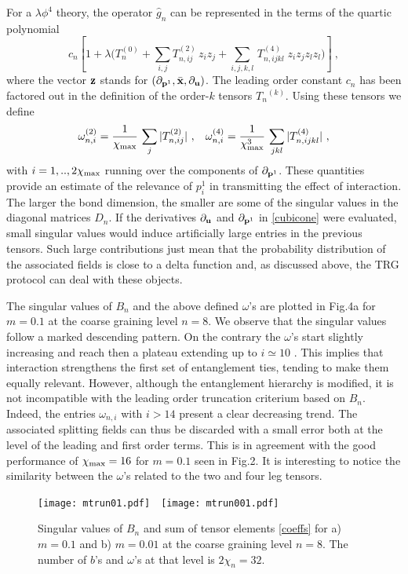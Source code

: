 \documentclass[a4paper,preprintnumbers,nofootinbib,twocolumn]{quantumarticle}
\newcommand{\be}{\begin{equation}} \newcommand{\ee}{\end{equation}}
\begin{document}
For a $\lambda \phi^4$ theory,  the operator ${\hat g}_n$ 
can be represented in the terms of the quartic polynomial
\be
c_n \left[ 1+\lambda \Big( T^{(0)}_n + \sum_{i,j} T^{(2)}_{n,ij}\,  z_i z_j +   \sum_{i,j,k,l} \, T^{(4)}_{n,ijkl} \; z_i z_j z_l z_l  \Big)  \right]\ ,
\label{poly}
\ee
where the vector ${\bf z}$  stands for  $( \partial_{{\bf p}^1},{\bar {\bf x}}, \partial_{{\bf u}})$. 
The leading order constant $c_n$ 
has been factored out in the definition of the order-$k$ tensors ${T_n}^{(k)}$. Using these tensors we define
\be
\omega_{n,i}^{(2)}={1 \over \chi_{\rm max}} \, \sum_j |T^{(2)}_{n,ij}| \ , \hspace{3mm} \omega_{n,i}^{(4)}= {1 \over \chi_{\rm max}^3}\, \sum_{jkl} |T^{(4)}_{n,ijkl} | \ ,
\label{coeffs}
\ee
with $i=1,..,2\chi_{\rm max}$ running over the components of $\partial_{{\bf p}^1}$. 
These quantities provide an estimate of the relevance of $p^1_i$ in transmitting the effect of interaction. 
The larger the bond dimension, the smaller are some of the singular values in the diagonal matrices $D_n$.
If the derivatives $\partial_{\bf u}$ and $\partial_{{\bf p}^1}$ in \eqref{cubicone} were evaluated, small singular values would induce artificially large entries in the previous tensors. 
Such large contributions just mean that the probability distribution of the associated fields is close to a delta function
and, as discussed above, the TRG protocol can deal with these objects.

The singular values of $B_n$ and the above defined $\omega$'s are plotted in Fig.4a for $m=0.1$ at the coarse graining level $n=8$. 
We observe that the singular values follow a marked descending pattern.  On the contrary the $\omega$'s start slightly increasing and reach then a plateau extending up to $i \simeq 10$ . 
This implies that interaction strengthens the first set of entanglement ties, tending to make them equally relevant. However, although the entanglement hierarchy is modified, 
it is not incompatible with the leading order truncation criterium based on $B_n$. Indeed, 
the entries $\omega_{n,i}$ with $i > 14$ present a clear decreasing trend. The associated 
splitting fields  can thus be discarded with a small error both at the level of the leading and first order terms. This is in agreement with the good performance of $\chi_{\rm max}=16$ for $m=0.1$ seen in Fig.2.
It is interesting to notice the similarity between the $\omega$'s related to the two and four leg tensors.

\begin{figure}[h]
\begin{center}
\texttt{[image: mtrun01.pdf]}~~\texttt{[image: mtrun001.pdf]}
\end{center}
\vspace*{-5mm}
\caption{\label{fig:fe2} Singular values of $B_n$ and sum of tensor elements \eqref{coeffs} for a) $m=0.1$ and b) $m=0.01$ at the coarse graining level $n=8$. The number of $b$'s and $\omega$'s at that level is $2 \chi_n=32$.}
\end{figure}
\end{document}
